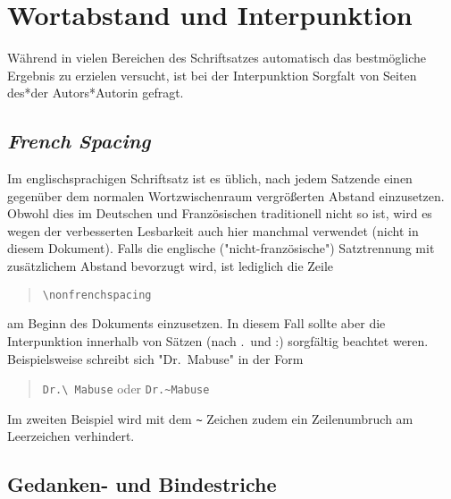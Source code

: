 \section{Wortabstand und Interpunktion}

Während \latex in vielen Bereichen des Schriftsatzes automatisch das
bestmögliche Ergebnis zu erzielen versucht, ist bei der Interpunktion
Sorgfalt von Seiten des*der Autors*Autorin gefragt.

\subsection{\emph{French Spacing}}

Im englischsprachigen Schriftsatz ist es üblich, nach jedem
Satzende einen gegenüber dem normalen Wortzwischenraum
vergrößerten Abstand einzusetzen. Obwohl dies im Deutschen und
Französischen traditionell nicht so ist, wird es wegen der
verbesserten Lesbarkeit auch hier manchmal verwendet (nicht in diesem
Dokument). Falls die englische ("nicht-französische") Satztrennung mit
zusätzlichem Abstand bevorzugt wird, ist lediglich die Zeile
%
\begin{quote}
\verb!\nonfrenchspacing!
\end{quote}
%
am Beginn des Dokuments einzusetzen. 
In diesem Fall sollte 
aber die Interpunktion innerhalb von
Sätzen (nach .\ und :) sorgfältig beachtet weren. Beispielsweise
schreibt sich "Dr.\ Mabuse" in der Form
%
\begin{quote}
\verb!Dr.\ Mabuse! oder \verb!Dr.~Mabuse!
\end{quote}
%
Im zweiten Beispiel wird mit dem \verb!~! Zeichen zudem ein Zeilenumbruch am Leerzeichen verhindert.


\subsection{Gedanken- und Bindestriche}
\label{sec:gedankenstrich}


